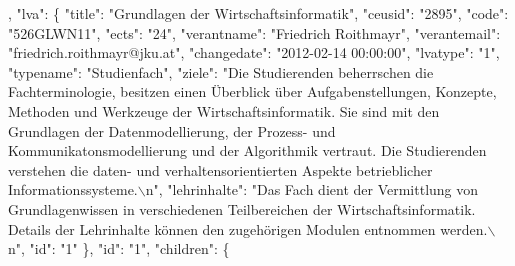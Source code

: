 \begin{DoxyCodeInclude}
[
    \{
        \textcolor{stringliteral}{"tid"}: \textcolor{stringliteral}{"1"},
        \textcolor{stringliteral}{"vid"}: \textcolor{stringliteral}{"2"},
        \textcolor{stringliteral}{"name"}: \textcolor{stringliteral}{"Studienfach: Grundlagen der Wirtschaftsinformatik"},
        \textcolor{stringliteral}{"description"}: \textcolor{stringliteral}{"1"},
        \textcolor{stringliteral}{"format"}: null,
        \textcolor{stringliteral}{"weight"}: \textcolor{stringliteral}{"0"},
        \textcolor{stringliteral}{"depth"}: 0,
        \textcolor{stringliteral}{"parents"}: [
            \textcolor{stringliteral}{"0"}
        ],
        \textcolor{stringliteral}{"lva"}: \{
            \textcolor{stringliteral}{"title"}: \textcolor{stringliteral}{"Grundlagen der Wirtschaftsinformatik"},
            \textcolor{stringliteral}{"ceusid"}: \textcolor{stringliteral}{"2895"},
            \textcolor{stringliteral}{"code"}: \textcolor{stringliteral}{"526GLWN11"},
            \textcolor{stringliteral}{"ects"}: \textcolor{stringliteral}{"24"},
            \textcolor{stringliteral}{"verantname"}: \textcolor{stringliteral}{"Friedrich Roithmayr"},
            \textcolor{stringliteral}{"verantemail"}: \textcolor{stringliteral}{"friedrich.roithmayr@jku.at"},
            \textcolor{stringliteral}{"changedate"}: \textcolor{stringliteral}{"2012-02-14 00:00:00"},
            \textcolor{stringliteral}{"lvatype"}: \textcolor{stringliteral}{"1"},
            \textcolor{stringliteral}{"typename"}: \textcolor{stringliteral}{"Studienfach"},
            \textcolor{stringliteral}{"ziele"}: \textcolor{stringliteral}{"Die Studierenden beherrschen die Fachterminologie, besitzen einen Überblick über
       Aufgabenstellungen, Konzepte, Methoden und Werkzeuge der Wirtschaftsinformatik. Sie sind mit den Grundlagen der
       Datenmodellierung, der Prozess- und Kommunikatonsmodellierung und der Algorithmik vertraut. Die Studierenden
       verstehen die daten- und verhaltensorientierten Aspekte betrieblicher Informationssysteme.\(\backslash\)n"},
            \textcolor{stringliteral}{"lehrinhalte"}: \textcolor{stringliteral}{"Das Fach dient der Vermittlung von Grundlagenwissen in verschiedenen
       Teilbereichen der Wirtschaftsinformatik. Details der Lehrinhalte können den zugehörigen Modulen entnommen werden.\(\backslash\)n"},
            \textcolor{stringliteral}{"id"}: \textcolor{stringliteral}{"1"}
        \},
        \textcolor{stringliteral}{"id"}: \textcolor{stringliteral}{"1"},
        \textcolor{stringliteral}{"children"}: \{

\end{DoxyCodeInclude}
